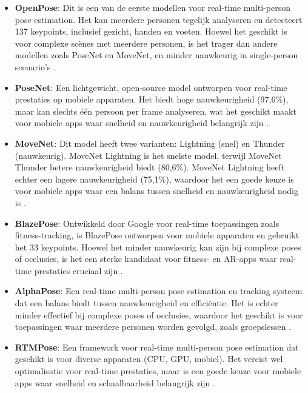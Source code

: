 \begin{itemize}
    \item \textbf{OpenPose}: Dit is een van de eerste modellen voor real-time multi-person pose estimation. Het kan meerdere personen tegelijk analyseren en detecteert 137 keypoints, inclusief gezicht, handen en voeten. Hoewel het geschikt is voor complexe scènes met meerdere personen, is het trager dan andere modellen zoals PoseNet en MoveNet, en minder nauwkeurig in single-person scenario’s \autocite{BeomjunEtAl2022}.

    \item \textbf{PoseNet}: Een lichtgewicht, open-source model ontworpen voor real-time prestaties op mobiele apparaten. Het biedt hoge nauwkeurigheid (97,6\%), maar kan slechts één persoon per frame analyseren, wat het geschikt maakt voor mobiele apps waar snelheid en nauwkeurigheid belangrijk zijn \autocite{BeomjunEtAl2022}.

    \item \textbf{MoveNet}: Dit model heeft twee varianten: Lightning (snel) en Thunder (nauwkeurig). MoveNet Lightning is het snelste model, terwijl MoveNet Thunder betere nauwkeurigheid biedt (80,6\%). MoveNet Lightning heeft echter een lagere nauwkeurigheid (75,1\%), waardoor het een goede keuze is voor mobiele apps waar een balans tussen snelheid en nauwkeurigheid nodig is \autocite{BeomjunEtAl2022}.

    \item \textbf{BlazePose}: Ontwikkeld door Google voor real-time toepassingen zoals fitness-tracking, is BlazePose ontworpen voor mobiele apparaten en gebruikt het 33 keypoints. Hoewel het minder nauwkeurig kan zijn bij complexe poses of occlusies, is het een sterke kandidaat voor fitness- en AR-apps waar real-time prestaties cruciaal zijn \autocite{PauloEtAl2024}.

    \item \textbf{AlphaPose}: Een real-time multi-person pose estimation en tracking systeem dat een balans biedt tussen nauwkeurigheid en efficiëntie. Het is echter minder effectief bij complexe poses of occlusies, waardoor het geschikt is voor toepassingen waar meerdere personen worden gevolgd, zoals groepslessen \autocite{PauloEtAl2024}.

    \item \textbf{RTMPose}: Een framework voor real-time multi-person pose estimation dat geschikt is voor diverse apparaten (CPU, GPU, mobiel). Het vereist wel optimalisatie voor real-time prestaties, maar is een goede keuze voor mobiele apps waar snelheid en schaalbaarheid belangrijk zijn \autocite{JiangEtAl2023}.


\end{itemize}
